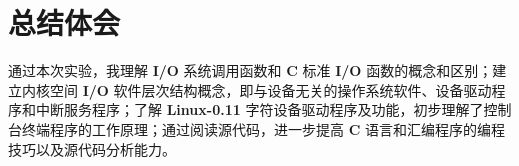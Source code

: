 \section{总结体会}
    \par 通过本次实验，我理解 \textbf{I/O} 系统调用函数和 \textbf{C} 标准 \textbf{I/O} 函数的概念和区别；建立内核空间 \textbf{I/O} 软件层次结构概念，即与设备无关的操作系统软件、设备驱动程序和中断服务程序；了解 \textbf{Linux-0.11} 字符设备驱动程序及功能，初步理解了控制台终端程序的工作原理；通过阅读源代码，进一步提高 \textbf{C} 语言和汇编程序的编程技巧以及源代码分析能力。
  